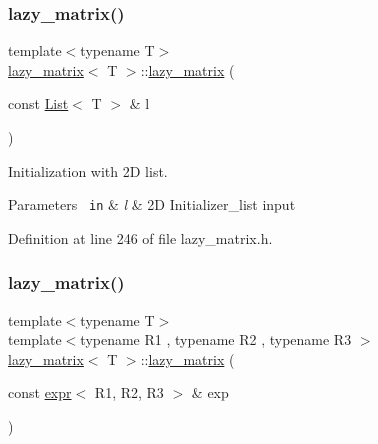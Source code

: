 \subsubsection{\texorpdfstring{lazy\_matrix()}{lazy\_matrix()}\hspace{0.1cm}{\footnotesize\ttfamily [5/6]}}
{\footnotesize\ttfamily template$<$typename T$>$ \\
\mbox{\hyperlink{classlazy__matrix}{lazy\+\_\+matrix}}$<$ T $>$\+::\mbox{\hyperlink{classlazy__matrix}{lazy\+\_\+matrix}} (\begin{DoxyParamCaption}\item[{const \mbox{\hyperlink{lazy__matrix_8h_a9421479667ba20cc5361aa756ae056d7}{List}}$<$ T $>$ \&}]{l }\end{DoxyParamCaption})\hspace{0.3cm}{\ttfamily [inline]}}



Initialization with 2D list. 


\begin{DoxyParams}[1]{Parameters}
\mbox{\texttt{ in}}  & {\em l} & 2D Initializer\+\_\+list input \\
\hline
\end{DoxyParams}


Definition at line 246 of file lazy\+\_\+matrix.\+h.

\mbox{\label{classlazy__matrix_af27fa9d4de82b3b89eae883404a8033d}} 
\subsubsection{\texorpdfstring{lazy\_matrix()}{lazy\_matrix()}\hspace{0.1cm}{\footnotesize\ttfamily [6/6]}}
{\footnotesize\ttfamily template$<$typename T$>$ \\
template$<$typename R1 , typename R2 , typename R3 $>$ \\
\mbox{\hyperlink{classlazy__matrix}{lazy\+\_\+matrix}}$<$ T $>$\+::\mbox{\hyperlink{classlazy__matrix}{lazy\+\_\+matrix}} (\begin{DoxyParamCaption}\item[{const \mbox{\hyperlink{classexpr}{expr}}$<$ R1, R2, R3 $>$ \&}]{exp }\end{DoxyParamCaption})\hspace{0.3cm}{\ttfamily [inline]}}



